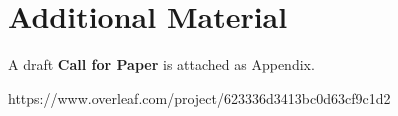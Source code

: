 \section{Additional Material}
\label{sec:Appendix}

A draft \textbf{Call for Paper} is attached as Appendix.


\newpage


https://www.overleaf.com/project/623336d3413bc0d63cf9c1d2